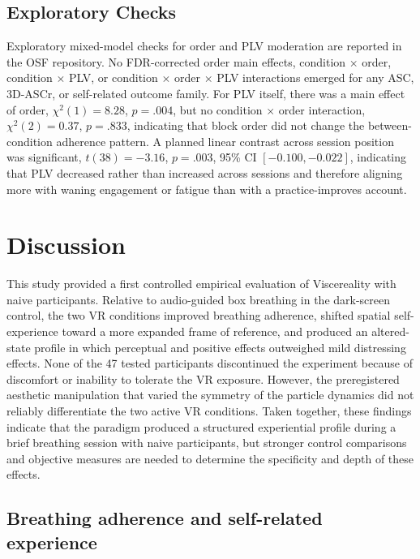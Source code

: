 \documentclass[pdflatex,sn-basic,lineno]{sn-jnl}
\begin{document}
\subsection{Exploratory Checks}\label{subsec:results_exploratory}

Exploratory mixed-model checks for order and PLV moderation are reported in the OSF repository. No FDR-corrected order main effects, condition $\times$ order, condition $\times$ PLV, or condition $\times$ order $\times$ PLV interactions emerged for any ASC, 3D-ASCr, or self-related outcome family. For PLV itself, there was a main effect of order, $\chi^2(1) = 8.28$, $p = .004$, but no condition $\times$ order interaction, $\chi^2(2) = 0.37$, $p = .833$, indicating that block order did not change the between-condition adherence pattern. A planned linear contrast across session position was significant, $t(38) = -3.16$, $p = .003$, 95\% CI $[-0.100, -0.022]$, indicating that PLV decreased rather than increased across sessions and therefore aligning more with waning engagement or fatigue than with a practice-improves account.


\section{Discussion}\label{sec:discussion}


This study provided a first controlled empirical evaluation of Viscereality with naive participants. Relative to audio-guided box breathing in the dark-screen control, the two VR conditions improved breathing adherence, shifted spatial self-experience toward a more expanded frame of reference, and produced an altered-state profile in which perceptual and positive effects outweighed mild distressing effects. None of the 47 tested participants discontinued the experiment because of discomfort or inability to tolerate the VR exposure. However, the preregistered aesthetic manipulation that varied the symmetry of the particle dynamics did not reliably differentiate the two active VR conditions. Taken together, these findings indicate that the paradigm produced a structured experiential profile during a brief breathing session with naive participants, but stronger control comparisons and objective measures are needed to determine the specificity and depth of these effects.


\subsection{Breathing adherence and self-related experience}
\end{document}
